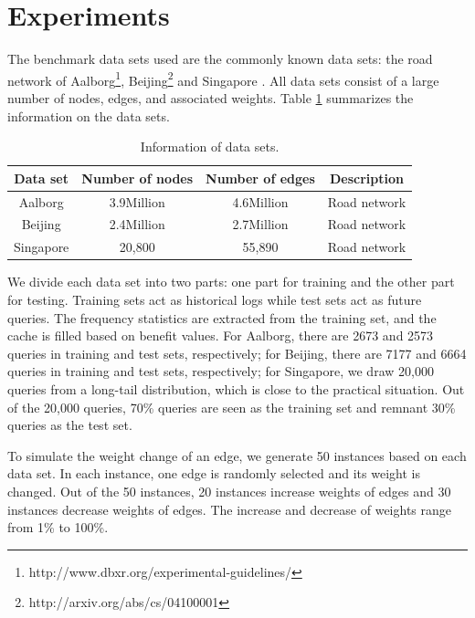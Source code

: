 \section{Experiments }
\label{sec:exp}

The benchmark data sets used are the commonly known data sets: the road network of Aalborg\footnote{http://www.dbxr.org/experimental-guidelines/}, Beijing\footnote{http://arxiv.org/abs/cs/04100001}
and Singapore \citep{Song2014PRESS}. All data sets consist of a large number of nodes, edges, and associated weights. Table \ref{tab:datasetinfo} summarizes the information on the data sets.

 \begin{table}[h]
 \caption{Information of data sets.}
 \centering
 \label{tab:datasetinfo}
{
 \begin{tabular}{|c|c|c|c|}
 \hline
  Data set   & Number of nodes &Number of edges & Description\\
  \hline
  Aalborg    &3.9Million&4.6Million&Road network\\
  \hline
   Beijing   &2.4Million&2.7Million&Road network\\
  \hline
   Singapore & 20,800&55,890&Road network\\
   \hline
 \end{tabular}
}
\end{table}

We divide each data set into two parts: one part for training and the other part for testing. Training sets act as historical logs while test sets act as future queries. The frequency statistics are extracted from the training set, and the cache is filled based on benefit values.
For Aalborg, there are 2673 and 2573 queries in training and test sets, respectively; for Beijing, there are 7177 and 6664 queries in training and test sets, respectively; for Singapore, we draw 20,000 queries from a long-tail distribution, which is close to the practical situation. Out of the 20,000 queries, 70\% queries are seen as the training set and remnant 30\% queries as the test set.

%
To simulate the weight change of an edge, we generate 50 instances based on each data set. In each instance, one edge is randomly selected and its weight is changed. Out of the 50 instances, 20 instances increase weights of edges and 30 instances decrease weights of edges.
The increase and decrease of weights range from 1\% to 100\%.


